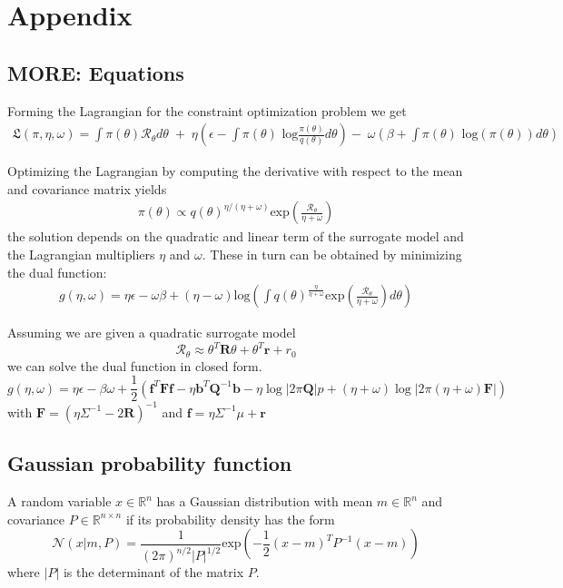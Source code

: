 
\chapter{Appendix}

\section{MORE: Equations}\label{more_appendix}
Forming the Lagrangian for the constraint optimization problem we get
\begin{align*} \mathfrak{L}(\pi, \eta, \omega) = 
\int \pi(\theta) \mathcal{R}_{\theta} d\theta \; + \; 
\eta  \left(\epsilon - \int \pi(\theta) \text{ log}
 \frac{\pi(\theta)}{q(\theta)} d\theta\right)
 - \; \omega \left(\beta + \int \pi(\theta) \text{ log}(\pi(\theta)) d\theta\right)
\end{align*}

Optimizing the Lagrangian by computing the derivative with respect
to the mean and covariance matrix yields
\begin{align*}
\pi(\theta) \propto q(\theta)^{\eta/(\eta+\omega)} 
\text{exp}\left(\frac{\mathcal{R}_\theta}{\eta + \omega}\right)
\end{align*}
the solution depends on the quadratic and linear term
of the surrogate model and the
Lagrangian multipliers
$\eta$ and $\omega$. These in turn can be obtained by
minimizing the dual function:
\begin{align}
  \label{eq:dual}
  g(\eta,\omega) = \eta\epsilon - \omega\beta + (\eta - \omega) \text{log}
\left(\int q(\theta)^{\frac{\eta}{\eta + \omega}}
  \text{exp}\left(\frac{\mathcal{R}_\theta}{\eta + \omega}\right) d\theta \right)
\end{align}

Assuming we are given a quadratic surrogate model
$$ \mathcal{R}_\theta \approx \theta^T \mathbf{R} \theta + \theta^T \mathbf{r} + r_0 $$
we can solve the dual function in closed form.
$$ g(\eta, \omega) = \eta \epsilon - \beta \omega
+ \frac{1}{2} \left(\mathbf{f}^T \mathbf{F} \mathbf{f}
  - \eta \mathbf{b}^T \mathbf{Q}^{-1}
  \mathbf{b} - \eta \log |2\pi \mathbf{Q}|p
  + (\eta + \omega) \log |2\pi (\eta + \omega)
\mathbf{F}| \right) $$
with $\mathbf{F} = (\eta \Sigma^{-1} - 2 \mathbf{R})^{-1}$ and
$\mathbf{f} = \eta \Sigma^{-1} \mu + \mathbf{r}$


\section{Gaussian probability function}\label{gauss_pdf}
A random variable $x \in \mathbb{R}^n$ has a Gaussian distribution with mean
$m \in \mathbb{R}^n$ and covariance $P \in \mathbb{R}^{n\times n}$ if its
probability density has the form
$$ \mathcal{N}(x | m, P) = \frac{1}{(2\pi)^{n / 2} |P|^{1/2}}
\text{exp} \left( -\frac{1}{2} (x - m)^T P^{-1} (x-m) \right) $$
where $|P|$ is the determinant of the matrix $P$.

